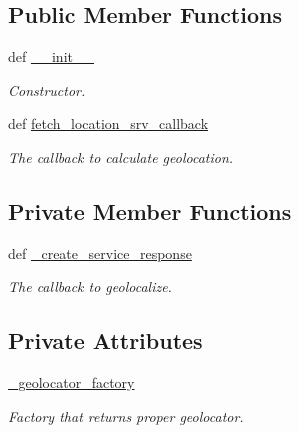 \subsection*{Public Member Functions}
\begin{DoxyCompactItemize}
\item 
def \hyperlink{classrapp__geolocator_1_1geolocator__node_1_1GeolocatorNode_a6fc11e9691f00f13b059c29bf3e34da4}{\-\_\-\-\_\-init\-\_\-\-\_\-}
\begin{DoxyCompactList}\small\item\em Constructor. \end{DoxyCompactList}\item 
def \hyperlink{classrapp__geolocator_1_1geolocator__node_1_1GeolocatorNode_a15c45fa20859d208f5fbff1b2d5e9f7c}{fetch\-\_\-location\-\_\-srv\-\_\-callback}
\begin{DoxyCompactList}\small\item\em The callback to calculate geolocation. \end{DoxyCompactList}\end{DoxyCompactItemize}
\subsection*{Private Member Functions}
\begin{DoxyCompactItemize}
\item 
def \hyperlink{classrapp__geolocator_1_1geolocator__node_1_1GeolocatorNode_a0881892742b4a53a121d7772601a8bf8}{\-\_\-create\-\_\-service\-\_\-response}
\begin{DoxyCompactList}\small\item\em The callback to geolocalize. \end{DoxyCompactList}\end{DoxyCompactItemize}
\subsection*{Private Attributes}
\begin{DoxyCompactItemize}
\item 
\hyperlink{classrapp__geolocator_1_1geolocator__node_1_1GeolocatorNode_a51f254d9011693bf7399720e12b1d108}{\-\_\-geolocator\-\_\-factory}
\begin{DoxyCompactList}\small\item\em Factory that returns proper geolocator. \end{DoxyCompactList}\end{DoxyCompactItemize}


